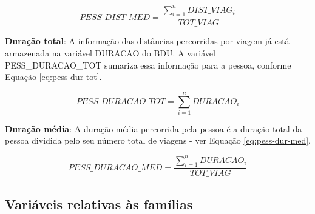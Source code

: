 \begin{compactitem}
\begin{equation}\label{eq:pess-dist-med}
PESS\_DIST\_MED=\frac{\displaystyle\sum_{i=1}^{n}DIST\_VIAG_{i}}{TOT\_VIAG}
\end{equation}

\item \textbf{Duração total}: A informação das distâncias percorridas por viagem já está armazenada na variável DURACAO do BDU. A variável PESS_DURACAO_TOT sumariza essa informação para a pessoa, conforme Equação \eqref{eq:pess-dur-tot}.

\begin{equation}\label{eq:pess-dur-tot}
PESS\_DURACAO\_TOT=\displaystyle\sum_{i=1}^{n}DURACAO_{i}
\end{equation}

\item \textbf{Duração média}: A duração média percorrida pela pessoa é a duração total da pessoa dividida pelo seu número total de viagens - ver Equação \eqref{eq:pess-dur-med}.

\begin{equation}\label{eq:pess-dur-med}
PESS\_DURACAO\_MED=\frac{\displaystyle\sum_{i=1}^{n}DURACAO_{i}}{TOT\_VIAG}
\end{equation}

\end{compactitem}

\subsection{Variáveis relativas às famílias}\label{subsec:novas-var-fam}

